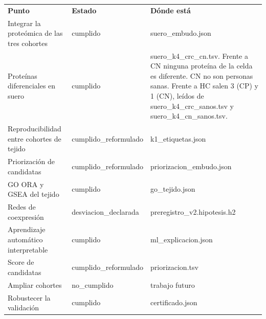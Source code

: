\begin{tabular}{p{3.2cm}p{3.4cm}p{7.2cm}}
\textbf{Punto} & \textbf{Estado} & \textbf{Dónde está} \\
Integrar la proteómica de las tres cohortes & cumplido & suero\_embudo.json \\
Proteínas diferenciales en suero & cumplido & suero\_k4\_crc\_cn.tsv. Frente a CN ninguna proteína de la celda es diferente. CN no son personas sanas. Frente a HC salen 3 (CP) y 1 (CN), leídos de suero\_k4\_crc\_sanos.tsv y suero\_k4\_cn\_sanos.tsv. \\
Reproducibilidad entre cohortes de tejido & cumplido\_reformulado & k1\_etiquetas.json \\
Priorización de candidatas & cumplido\_reformulado & priorizacion\_embudo.json \\
GO ORA y GSEA del tejido & cumplido & go\_tejido.json \\
Redes de coexpresión & desviacion\_declarada & preregistro\_v2.hipotesis.h2 \\
Aprendizaje automático interpretable & cumplido & ml\_explicacion.json \\
Score de candidatas & cumplido\_reformulado & priorizacion.tsv \\
Ampliar cohortes & no\_cumplido & trabajo futuro \\
Robustecer la validación & cumplido & certificado.json \\
\end{tabular}
